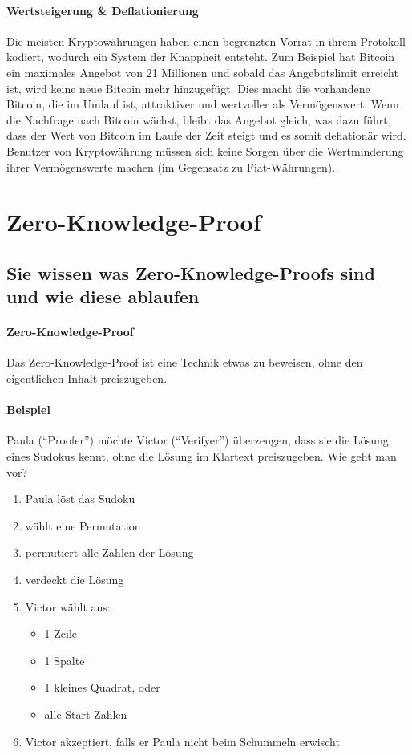 \documentclass[10pt,a4paper]{article}
\begin{document}
\paragraph*{Wertsteigerung \& Deflationierung}
Die meisten Kryptowährungen haben einen begrenzten Vorrat in ihrem Protokoll kodiert, wodurch ein System der Knappheit entsteht. Zum Beispiel hat Bitcoin ein maximales Angebot von 21 Millionen und sobald das Angebotslimit erreicht ist, wird keine neue Bitcoin mehr hinzugefügt. Dies macht die vorhandene Bitcoin, die im Umlauf ist, attraktiver und wertvoller als Vermögenswert. Wenn die Nachfrage nach Bitcoin wächst, bleibt das Angebot gleich, was dazu führt, dass der Wert von Bitcoin im Laufe der Zeit steigt und es somit deflationär wird. Benutzer von Kryptowährung müssen sich keine Sorgen über die Wertminderung ihrer Vermögenswerte machen (im Gegensatz zu Fiat-Währungen).


\section{Zero-Knowledge-Proof}
\subsection*{Sie wissen was Zero-Knowledge-Proofs sind und wie diese ablaufen}
\paragraph*{Zero-Knowledge-Proof}Das Zero-Knowledge-Proof ist eine Technik etwas zu beweisen, ohne den eigentlichen Inhalt preiszugeben.

\paragraph*{Beispiel}Paula ("`Proofer"') möchte Victor ("`Verifyer"') überzeugen, dass sie die Lösung eines Sudokus kennt, ohne die Lösung im Klartext preiszugeben. Wie geht man vor?
\begin{enumerate}[noitemsep,topsep=0pt,leftmargin=*]
    \item Paula löst das Sudoku
    \item wählt eine Permutation
    \item permutiert alle Zahlen der Lösung
    \item verdeckt die Lösung
    \item Victor wählt aus:
    \begin{itemize}[noitemsep,topsep=0pt,leftmargin=*]
        \item 1 Zeile
        \item 1 Spalte
        \item 1 kleines Quadrat, oder
        \item alle Start-Zahlen
    \end{itemize}
    \item Victor akzeptiert, falls er Paula nicht beim Schummeln erwischt
\end{enumerate}
\end{document}
